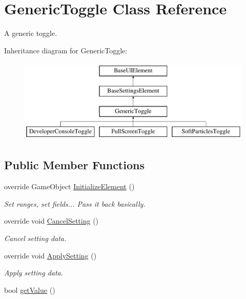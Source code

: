 \hypertarget{class_generic_toggle}{}\section{Generic\+Toggle Class Reference}
\label{class_generic_toggle}


A generic toggle.  


Inheritance diagram for Generic\+Toggle\+:\begin{figure}[H]
\begin{center}
\leavevmode
\includegraphics[height=4.000000cm]{class_generic_toggle}
\end{center}
\end{figure}
\subsection*{Public Member Functions}
\begin{DoxyCompactItemize}
\item 
override Game\+Object \hyperlink{class_generic_toggle_a8c2225448b96a690f72c7a834cb73097}{Initialize\+Element} ()
\begin{DoxyCompactList}\small\item\em Set ranges, set fields... Pass it back basically. \end{DoxyCompactList}\item 
override void \hyperlink{class_generic_toggle_a11d9c35a3c20308376d1a126c3bfc874}{Cancel\+Setting} ()
\begin{DoxyCompactList}\small\item\em Cancel setting data. \end{DoxyCompactList}\item 
override void \hyperlink{class_generic_toggle_af184e77b892617775fd0785fad7e750a}{Apply\+Setting} ()
\begin{DoxyCompactList}\small\item\em Apply setting data. \end{DoxyCompactList}\item 
bool \hyperlink{class_generic_toggle_a86ef0ed30fdcb26b5a0c9e2e06590cda}{get\+Value} ()
\end{DoxyCompactItemize}
